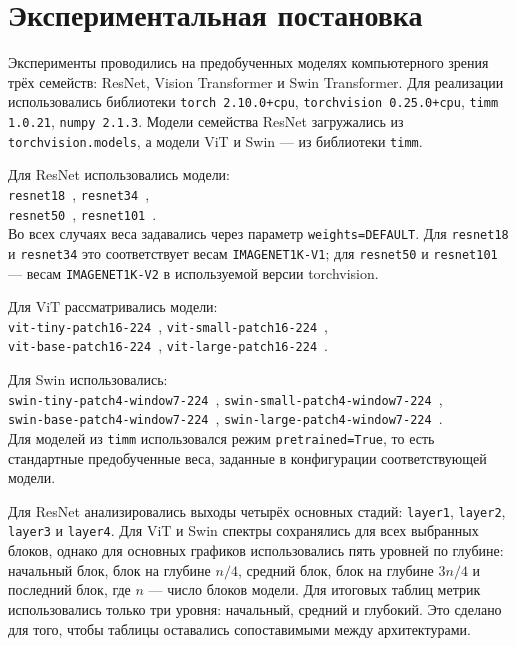 \section{Экспериментальная постановка}

Эксперименты проводились на предобученных моделях компьютерного зрения трёх семейств: ResNet, Vision Transformer и Swin Transformer. Для реализации использовались библиотеки \texttt{torch 2.10.0+cpu}, \texttt{torchvision 0.25.0+cpu}, \texttt{timm 1.0.21}, \texttt{numpy 2.1.3}. Модели семейства ResNet загружались из \texttt{torchvision.models}, а модели ViT и Swin — из библиотеки \texttt{timm}. 

Для ResNet использовались модели: \\ \texttt{resnet18}~\cite{hf_resnet18_tv_in1k}, \texttt{resnet34}~\cite{hf_resnet34_tv_in1k}, \\ \texttt{resnet50}~\cite{hf_resnet50_tv2_in1k}, \texttt{resnet101}~\cite{hf_resnet101_tv2_in1k}. \\ Во всех случаях веса задавались через параметр \texttt{weights=DEFAULT}. Для \texttt{resnet18} и \texttt{resnet34} это соответствует весам \texttt{IMAGENET1K-V1}; для \texttt{resnet50} и \texttt{resnet101} — весам \texttt{IMAGENET1K-V2} в используемой версии torchvision. 

Для ViT рассматривались модели: \\ \texttt{vit-tiny-patch16-224}~\cite{hf_vit_tiny_patch16_224_augreg_in21k_ft_in1k}, \texttt{vit-small-patch16-224}~\cite{hf_vit_small_patch16_224_augreg_in21k_ft_in1k}, \\ \texttt{vit-base-patch16-224}~\cite{hf_vit_base_patch16_224_augreg_in21k_ft_in1k}, \texttt{vit-large-patch16-224}~\cite{hf_vit_large_patch16_224_augreg_in21k_ft_in1k}. 

Для Swin использовались: \\ \texttt{swin-tiny-patch4-window7-224}~\cite{hf_swin_tiny_patch4_window7_224_ms_in1k}, \texttt{swin-small-patch4-window7-224}~\cite{hf_swin_small_patch4_window7_224_ms_in1k}, \\ \texttt{swin-base-patch4-window7-224}~\cite{hf_swin_base_patch4_window7_224_ms_in1k}, \texttt{swin-large-patch4-window7-224}~\cite{hf_swin_large_patch4_window7_224_ms_in22k_ft_in1k}. \\ Для моделей из \texttt{timm} использовался режим \texttt{pretrained=True}, то есть стандартные предобученные веса, заданные в конфигурации соответствующей модели.

Для ResNet анализировались выходы четырёх основных стадий: \texttt{layer1}, \texttt{layer2}, \texttt{layer3} и \texttt{layer4}. Для ViT и Swin спектры сохранялись для всех выбранных блоков, однако для основных графиков использовались пять уровней по глубине: начальный блок, блок на глубине $n/4$, средний блок, блок на глубине $3n/4$ и последний блок, где $n$ — число блоков модели. Для итоговых таблиц метрик использовались только три уровня: начальный, средний и глубокий. Это сделано для того, чтобы таблицы оставались сопоставимыми между архитектурами.

